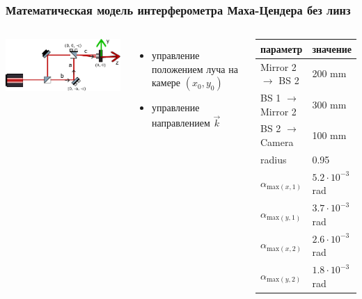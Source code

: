 \begin{frame}
\frametitle{Математическая модель интерферометра Маха-Цендера без линз}
\begin{columns}
  \centering
  \includegraphics[width=1\linewidth]{images/MZI_matmodel.pdf}
  \begin{itemize}
    \item управление положением луча на камере $(x_0, y_0)$
    \item управление направлением $\vec{k}$
  \end{itemize}

\begin{table} [htbp]
    \centering
    \begin{threeparttable}
        \begin{tabular}{| p{2.5cm} || p{2cm} |}
            \hline
            \hline
            параметр & значение \\
            \hline
            Mirror 2 $\to$ BS 2 & 200 mm\\
            BS 1 $\to$ Mirror 2 & 300 mm\\
            BS 2 $\to$ Camera & 100 mm\\
            radius & 0.95\\
            $\alpha_{{\mathrm{max}}(x,1)}$ & $5.2 \cdot 10^{-3}$ rad\\
            $\alpha_{{\mathrm{max}}(y,1)}$ & $3.7 \cdot 10^{-3}$ rad\\
            $\alpha_{{\mathrm{max}}(x,2)}$ & $2.6 \cdot 10^{-3}$ rad\\
            $\alpha_{{\mathrm{max}}(y,2)}$ & $1.8 \cdot 10^{-3}$ rad\\
            \hline
            \hline
        \end{tabular}
    \end{threeparttable}
\end{table}

\end{columns} 
\end{frame}


